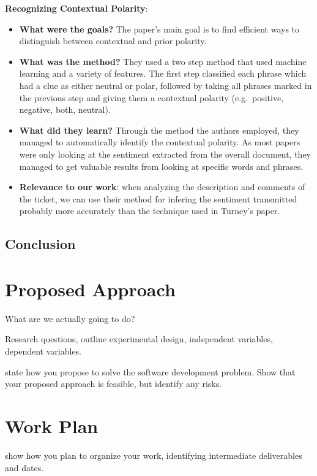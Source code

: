 \documentclass{mprop}
\begin{document}
\textbf{Recognizing Contextual Polarity}\cite{wilson2005recognizing}:
\begin{itemize}
  \item \textbf{What were the goals?}
    The paper's main goal is to find efficient ways to distinguish between 
    contextual and prior polarity.
  \item \textbf{What was the method?}
    They used a two step method that used machine learning and a variety of
    features. The first step classified each phrase which had a clue as either
    neutral or polar, followed by taking all phrases marked in the previous step
    and giving them a contextual polarity (e.g.\ positive, negative, 
    both, neutral).
  \item \textbf{What did they learn?}
    Through the method the authors employed, they managed to automatically 
    identify the contextual polarity. As most papers were only looking at the 
    sentiment extracted from the overall document, they managed to get valuable 
    results from looking at specific words and phrases.
  \item \textbf{Relevance to our work}: when analyzing the description and
    comments of the ticket, we can use their method for infering the sentiment 
    transmitted probably more accurately than the technique used in 
    Turney's paper\cite{turney2002thumbs}.
\end{itemize}

\subsection{Conclusion}

\section{Proposed Approach}


What are we actually going to do?

Research questions, outline experimental design, independent variables, dependent variables.



state how you propose to solve the software development problem. Show that your proposed approach is feasible, but identify any risks.

\section{Work Plan}


show how you plan to organize your work, identifying intermediate deliverables and dates.



\end{document}
